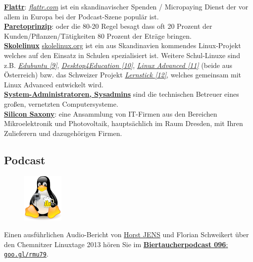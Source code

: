 \href{http://flattr.com}{\textbf{Flattr}}: \href{http://flattr.com}{\textit{flattr.com}} ist ein skandinavischer Spenden / Micropaying Dienst der vor allem in Europa bei der Podcast-Szene populär ist. \\

\href{http://de.wikipedia.org/wiki/Paretoprinzip}{\textbf{Paretoprinzip}}: oder die 80-20 Regel besagt dass oft 20 Prozent der Kunden/Pflanzen/Tätigkeiten 80 Prozent der Eträge bringen. \\

\href{http://www.skolelinux.org/}{\textbf{Skolelinux}} \href{http://skolelinux.org/}{skolelinux.org} ist ein aus Skandinavien kommendes Linux-Projekt welches auf den Einsatz in Schulen spezialisiert ist. Weitere Schul-Linuxe sind z.B. \href{http://www.edubuntu.org/}{\textit{Edubuntu [9]}}, \href{http://d4e.at/}{\textit{Desktop4Education [10]}}, \href{http://www.linuxadvanced.at/}{\textit{Linux Advanced [11]}} (beide aus Österreich) bzw. das Schweizer Projekt \href{http://www.imedias.ch/lernstick}{\textit{Lernstick [12]}}, welches gemeinsam mit Linux Advanced entwickelt wird. \\


\href{http://de.wikipedia.org/wiki/Systemadministrator}{\textbf{System-Administratoren, Sysadmins}} sind die technischen Betreuer eines großen, vernetzten Computersysteme.\\

\href{http://de.wikipedia.org/wiki/Silicon_Saxony}{\textbf{Silicon Saxony}}: eine Ansammlung von IT-Firmen aus den Bereichen Mikroelektronik und Photovoltaik, hauptsächlich im Raum Dresden, mit Ihren Zulieferern und dazugehörigen Firmen.

\subsection*{Podcast}
\begin{figure}
\includegraphics[width=2cm]{chemnitz/chemnitz-biertaucherlogo.png}
\end{figure}
Einen ausführlichen Audio-Bericht von \href{http://spielend-programmieren.at}{Horst JENS} und Florian Schweikert über den Chemnitzer Linuxtage 2013  hören Sie im \href{http://spielend-programmieren.at/de:podcast:biertaucher:2013:096}{\textbf{Biertaucherpodcast 096}: \texttt{goo.gl/rmu79}}. 

